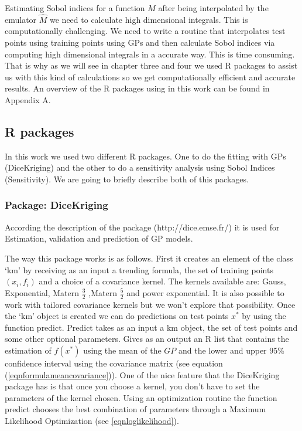 \documentclass[12pt]{book}
\begin{document}
Estimating Sobol indices for a function $M$ after being interpolated by the emulator $\hat{M}$
we need to calculate high dimensional integrals. This is computationally challenging.
We need to  write a routine that
interpolates test points using training points  using GPs and then   calculate 
Sobol indices via computing high dimensional integrals in a accurate way.  
This is  time consuming.
That is why as  we will see
in chapter three and  four we used R packages to assist us with this kind of calculations so
we get computationally efficient and accurate results. An overview of the R packages using 
in this work can be found in Appendix A. 



\subsection{R packages}
In this work we used two different R packages. One to do the fitting with GPs (DiceKriging) and the other to do 
a sensitivity analysis using Sobol Indices (Sensitivity). We are going to briefly describe both of this packages.

\subsubsection{Package: DiceKriging}
According the description of the package (http://dice.emse.fr/) it is used for Estimation, validation and 
prediction of GP models.

The way this package works is as follows. First it creates an element of the class `km' by receiving 
as an input a trending formula, the set of training points $(x_{i},f_{i})$ and a choice 
of a covariance kernel. The kernels available are: Gauss, Exponential, Matern $\frac{3}{2}$
,Matern $\frac{5}{2}$ and power exponential. It is also possible to work with tailored covariance
kernels but we won't explore that possibility. Once the `km' object is created we can do 
predictions on test points $x^{*}$ 
by using the function predict. Predict takes as an input a km object, the set of test points and 
some other optional parameters. Gives as an output an R list that contains the estimation of $f(x^{*})$
using the mean of the $GP$ and the lower and upper 95\% confidence interval using the 
covariance matrix (see equation (\ref{eqnformulameancovariance})).
One of the nice feature that the DiceKriging package has is that once you choose a kernel, you don't
have to set the parameters of the kernel chosen. Using an optimization routine the function
predict chooses the best combination
of parameters through a Maximum Likelihood Optimization \cite{dupuy2015dicedesign} (see \ref{eqnloglikelihood}).
\end{document}
